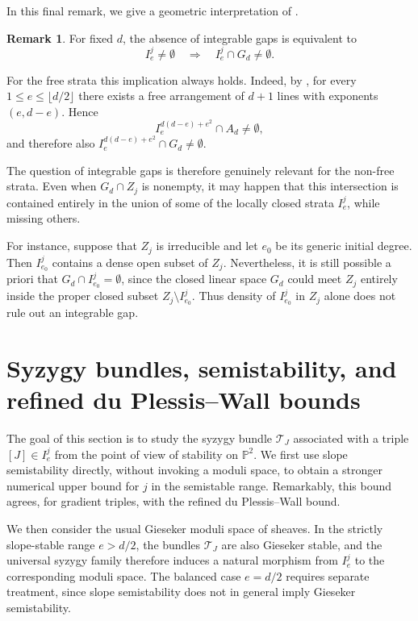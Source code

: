 \documentclass[11pt]{amsart} %
\theoremstyle{definition}
\newtheorem{Remark}[Theorem]{Remark}
\def\NZQ{\mathbb}               %
\def\PP{{\NZQ P}}
\def\T{{\mathcal T}}
\begin{document}
In this final remark, we give a geometric interpretation of \cite[Question 2.7]{JMNRS2026}.

\begin{Remark}\label{rmk:gaps-integrable-geometry}
For fixed $d$, the absence of integrable gaps is equivalent to
\[
I_e^j\neq\emptyset
\quad\Longrightarrow\quad
I_e^j\cap G_d\neq\emptyset.
\]

For the free strata this implication always holds. Indeed, by
\cite[Theorem~1.2]{dimca2015exponents}, for every
$1\le e\le\lfloor d/2\rfloor$ there exists a free arrangement of
$d+1$ lines with exponents $(e,d-e)$. Hence
\[
I_e^{d(d-e)+e^2}\cap A_d\neq\emptyset,
\]
and therefore also
\(
I_e^{d(d-e)+e^2}\cap G_d\neq\emptyset.
\)

The question of integrable gaps is therefore genuinely relevant for
the non-free strata. Even when $G_d\cap Z_j$ is nonempty, it may
happen that this intersection is contained entirely in the union of
some of the locally closed strata $I_e^j$, while missing others.

For instance, suppose that $Z_j$ is irreducible and let $e_0$ be its
generic initial degree. Then $I_{e_0}^j$ contains a dense open subset
of $Z_j$. Nevertheless, it is still possible a priori that \( G_d\cap I_{e_0}^j=\emptyset\), since the closed linear space $G_d$ could meet $Z_j$ entirely inside
the proper closed subset \(
Z_j\setminus I_{e_0}^j\). Thus density of $I_{e_0}^j$ in $Z_j$ alone does not rule out an
integrable gap.
\end{Remark}

\section{Syzygy bundles, semistability, and refined du Plessis--Wall bounds}\label{sec:semistable-syzygies}

The goal of this section is to study the syzygy bundle \(\T_J\) associated with a triple $[J]\in I_e^j$ from the point of view of
stability on $\PP^2$. We first use slope semistability directly,
without invoking a moduli space, to obtain a stronger numerical upper
bound for $j$ in the semistable range. Remarkably, this bound agrees,
for gradient triples, with the refined du Plessis--Wall bound.

We then consider the usual Gieseker moduli space of sheaves. In the
strictly slope-stable range $e>d/2$, the bundles $\T_J$ are also
Gieseker stable, and the universal syzygy family therefore induces a
natural morphism from $I_e^j$ to the corresponding moduli space. The
balanced case $e=d/2$ requires separate treatment, since slope
semistability does not in general imply Gieseker semistability.
\end{document}
